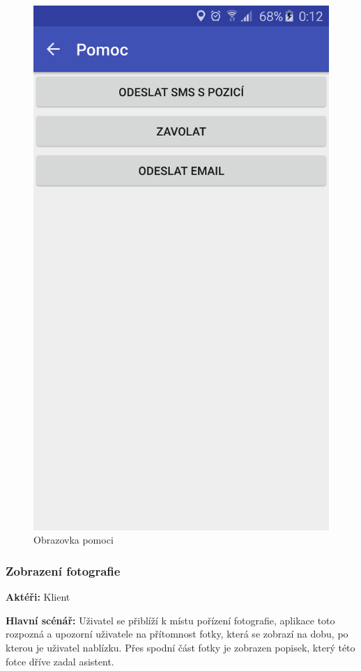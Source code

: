 \documentclass[czech,master,public,dept460,male,java,cpdeclaration]{diploma}
\newcommand{\usecase}[2]{\subsubsection{#1}\label{#2}}
\begin{document}
\begin{figure}[H]
\begin{minipage}{.5\textwidth}
                \includegraphics[scale=0.14]{img/screen/volanipomoc.jpg}
        \caption{Obrazovka pomoci}
        \label{fig:pomoc}
    \end{minipage}
\end{figure}



\usecase{Zobrazení fotografie}{zobrazenifotky}
\textbf{Aktéři:} Klient

\vspace{0.1cm}
\noindent
\textbf{Hlavní scénář:} Uživatel se přiblíží k místu pořízení fotografie, aplikace toto rozpozná
a upozorní uživatele na přítomnost fotky, která se zobrazí na dobu, po kterou je uživatel nablízku.
Přes spodní část fotky je zobrazen popisek, který této fotce dříve zadal asistent.
\end{document}
